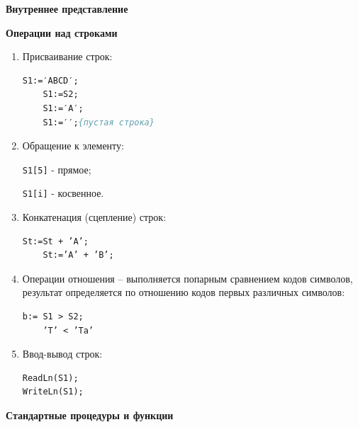 \noindent
{\bf{Внутреннее представление}}

\noindent
{\bf{Операции над строками}}
\begin{enumerate}
\item Присваивание строк:

\begin{lstlisting}[language=Pascal]
 	S1:=′ABCD′;
	S1:=S2;
	S1:=′A′;
	S1:=′′;{пустая строка}
\end{lstlisting}
    
\item Обращение к элементу:

	\texttt{S1[5]} - прямое;

	\texttt{S1[i]} - косвенное.

\item Конкатенация (сцепление) строк:

\begin{lstlisting}[language=Pascal]
	St:=St + ’A’;
	St:=’A’ + ’B’;
\end{lstlisting}

\item Операции отношения – выполняется попарным сравнением кодов символов, результат определяется по отношению кодов первых различных символов:

\begin{lstlisting}[language=Pascal]
	b:= S1 > S2;
	’T’ < ’Ta’
\end{lstlisting}

\item Ввод-вывод строк:

\begin{lstlisting}[language=Pascal]
ReadLn(S1);
WriteLn(S1);
\end{lstlisting}

\end{enumerate}

\vspace*{10pt}
\noindent
{\bf{Стандартные процедуры и функции}}

